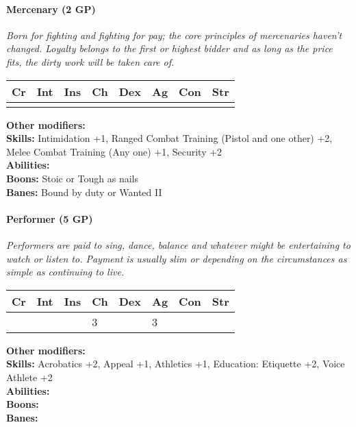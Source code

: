 \hrulefill
\paragraph*{Mercenary (2 GP)}
\textit{Born for fighting and fighting for pay; the core principles of mercenaries haven't changed. Loyalty belongs to the first or highest bidder and as long as the price fits, the dirty work will be taken care of.}\par
\begin{tabular}{|l|l|l|l|l|l|l|l|}
	\hline
	Cr & Int & Ins & Ch & Dex & Ag & Con & Str \\ \hline
	&  &  &  &  &  &  &  \\ \hline
\end{tabular}\par
\noindent\textbf{Other modifiers:} \\
\textbf{Skills:} Intimidation +1,
Ranged Combat Training (Pistol and one other) +2,
Melee Combat Training (Any one) +1,
Security +2\\
\textbf{Abilities:} \\
\textbf{Boons:} Stoic or Tough as nails\\
\textbf{Banes:} Bound by duty or Wanted II\\

\hrulefill
\paragraph*{Performer (5 GP)}
\textit{Performers are paid to sing, dance, balance and whatever might be entertaining to watch or listen to. Payment is usually slim or depending on the circumstances as simple as continuing to live.}\par
\begin{tabular}{|l|l|l|l|l|l|l|l|}
	\hline
	Cr & Int & Ins & Ch & Dex & Ag & Con & Str \\ \hline
	&  &  & 3 &  & 3 &  &  \\ \hline
\end{tabular}\par
\noindent\textbf{Other modifiers:} \\
\textbf{Skills:} Acrobatics +2,
Appeal +1,
Athletics +1,
Education: Etiquette +2,
Voice Athlete +2\\
\textbf{Abilities:} \\
\textbf{Boons:} \\
\textbf{Banes:} \\

\hrulefill
